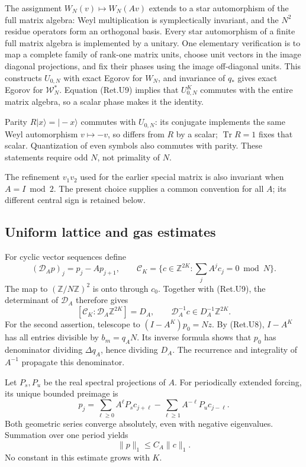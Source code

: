 The assignment \(W_N(v)\mapsto W_N(Av)\) extends to a star automorphism
of the full matrix algebra: Weyl multiplication is symplectically
invariant, and the \(N^2\) residue operators form an orthogonal basis.
Every star automorphism of a finite full matrix algebra is implemented
by a unitary. One elementary verification is to map a complete family
of rank-one matrix units, choose unit vectors in the image diagonal
projections, and fix their phases using the image off-diagonal units.
This constructs \(U_{0,N}\) with exact Egorov for \(W_N\), and invariance
of \(q_*\) gives exact Egorov for \(\mathcal W_N^*\).
Equation (Ret.U9) implies that \(U_{0,N}^K\) commutes with the entire
matrix algebra, so a scalar phase makes it the identity.

Parity \(R|x\rangle=|-x\rangle\) commutes with \(U_{0,N}\):
its conjugate implements the same Weyl automorphism \(v\mapsto-v\),
so differs from \(R\) by a scalar; \(\operatorname{Tr}R=1\) fixes that
scalar. Quantization of even symbols also commutes with parity.
These statements require odd \(N\), not primality of \(N\).

The refinement \(v_1v_2\) used for the earlier special matrix is also
invariant when \(A=I\bmod2\). The present choice supplies a common
convention for all \(A\); its different central sign is retained below.

\hypertarget{uniform-lattice-and-gas-estimates}{%
\subsection{Uniform lattice and gas estimates}\label{uniform-lattice-and-gas-estimates}}

For cyclic vector sequences define
\[
 (\mathcal D_Ap)_j=p_j-Ap_{j+1},\qquad
 \mathcal C_K=\{c\in\mathbb Z^{2K}:\sum_jA^jc_j=0\bmod N\}.
\]
The map to \((\mathbb Z/N\mathbb Z)^2\) is onto through \(c_0\).
Together with (Ret.U9), the determinant of \(\mathcal D_A\) therefore gives
\[
 [\mathcal C_K:\mathcal D_A\mathbb Z^{2K}]=D_A,\qquad
       \mathcal D_A^{-1}c\in D_A^{-1}\mathbb Z^{2K}.       \tag{Ret.U12}
\]
For the second assertion, telescope to
\((I-A^K)p_0=N z\). By (Ret.U8), \(I-A^K\) has all entries divisible
by \(b_m=q_A N\). Its inverse formula shows that \(p_0\) has
denominator dividing \(\Delta q_A\), hence dividing \(D_A\).
The recurrence and integrality of \(A^{-1}\) propagate this denominator.

Let \(P_s,P_u\) be the real spectral projections of \(A\).
For periodically extended forcing, its unique bounded preimage is
\[
 p_j=\sum_{\ell\ge0}A^\ell P_s c_{j+\ell}
                      -\sum_{\ell\ge1}A^{-\ell}P_u c_{j-\ell}.
\]
Both geometric series converge absolutely, even with negative
eigenvalues. Summation over one period yields
\[
                         \|p\|_1\le C_A\|c\|_1.          \tag{Ret.U13}
\]
No constant in this estimate grows with \(K\).


